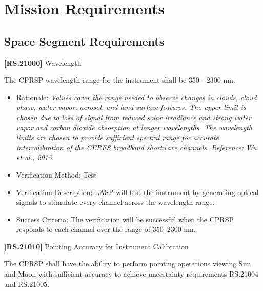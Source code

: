 \section{Mission Requirements}
\label{missionrequirements}

\subsection{Space Segment Requirements}
\label{spacesegmentrequirements}

\textbf{[RS.21000]} Wavelength

The \gls{CPRSP} wavelength range for the instrument shall be 350 - 2300 nm.

\begin{itemize}
\item{} Rationale: \emph{Values cover the range needed to observe changes in clouds, cloud phase, water vapor, aerosol, and land surface features. The upper limit is chosen due to loss of signal from reduced solar irradiance and strong water vapor and carbon dioxide absorption at longer wavelengths. The wavelength limits are chosen to provide sufficient spectral range for accurate intercalibration of the CERES broadband shortwave channels. Reference: Wu et al., 2015.}

\item{} Verification Method: Test

\item{} Verification Description: \gls{LASP} will \gls{test} the instrument by generating optical signals to stimulate every channel across the wavelength range.

\item{} Success Criteria: The verification will be successful when the \gls{CPRSP} responds to each channel over the range of 350--2300 nm.

\end{itemize}

\textbf{[RS.21010]} Pointing Accuracy for Instrument Calibration

The \gls{CPRSP} shall have the ability to perform \gls{point}ing operations viewing Sun and Moon with sufficient accuracy to achieve uncertainty requirements \gls{RS}.21004 and \gls{RS}.21005.

